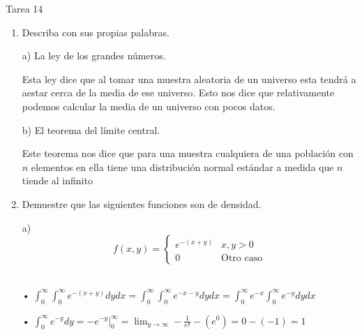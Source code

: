 \documentclass[a4paper, 12pt]{article}
\newcommand{\Aspace}{0.2cm}
\begin{document}
    \newpage
    \vspace{0.3cm}

    \begin{center}
        { \LARGE Tarea 14}
    \end{center}

    \begin{enumerate}
        \item Describa con sus propias palabras. \par          
            \vspace{\Aspace} \par
            a) La ley de los grandes números. 
            \par { \color{azul} Esta ley dice que al tomar una muestra aleatoria de un universo esta tendrá a aestar cerca de la media de ese universo. Esto nos dice que relativamente podemos calcular la media de un universo con pocos datos. }

            \vspace{\Aspace} \par
            b) El teorema del límite central.
            \par { \color{azul} Este teorema nos dice que para una muestra cualquiera de una población con $n$ elementos en ella tiene una distribución normal estándar a medida que $n$ tiende al infinito }
        

        \item Demuestre que las siguientes funciones son de densidad.
            \par a)
            \[
                f(x, y) =
                \begin{cases}
                    e^{-(x + y)}    &   x , y > 0           \\
                    0               &   \text{Otro caso}
                \end{cases}
            \]
            \vspace{\Aspace}
            { \color{azul} 
                \\ • \( 
                    \int_{0}^{\infty} \int_{0}^{\infty} e^{-(x + y)}dydx
                    = \int_{0}^{\infty} \int_{0}^{\infty} e^{-x-y}dydx
                    = \int_{0}^{\infty} e^{-x} \int_{0}^{\infty} e^{-y}dydx
                \)

                • \(
                    \int_{0}^{\infty} e^{-y}dy
                    = -e^{-y} \Big|_{0}^{\infty}
                    = \lim_{y \rightarrow \infty} -\frac{1}{e^{y}} - (e^{0})
                    = 0 - (-1)
                    = 1
                \)

}
\end{enumerate}
\end{document}
